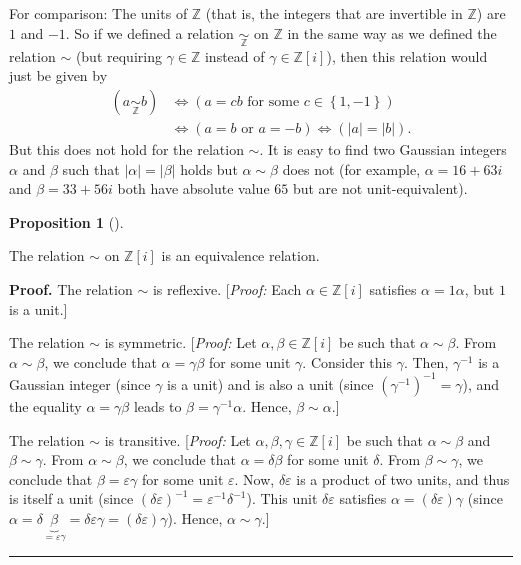 \documentclass[numbers=enddot,12pt,final,onecolumn,notitlepage]{scrartcl}%
\numberwithin{exer}{subsection}
\theoremstyle{definition}
\newtheorem{prop}[theo]{Proposition}
\newenvironment{proposition}[1][]
{\begin{prop}[#1]\begin{leftbar}}
{\end{leftbar}\end{prop}}
\newenvironment{proof}[1][Proof]{\noindent\textbf{#1.} }{\ \rule{0.5em}{0.5em}}
\begin{document}
For comparison: The units of $\mathbb{Z}$ (that is, the integers that are
invertible in $\mathbb{Z}$) are $1$ and $-1$. So if we defined a relation
$\underset{\mathbb{Z}}{\sim}$ on $\mathbb{Z}$ in the same way as we defined
the relation $\sim$ (but requiring $\gamma\in\mathbb{Z}$ instead of $\gamma
\in\mathbb{Z}\left[  i\right]  $), then this relation would just be given by%
\begin{align}
\left(  a\underset{\mathbb{Z}}{\sim}b\right)   &  \Longleftrightarrow\left(
a=cb\text{ for some }c\in\left\{  1,-1\right\}  \right) \nonumber\\
&  \Longleftrightarrow\left(  a=b\text{ or }a=-b\right)  \Longleftrightarrow
\left(  \left\vert a\right\vert =\left\vert b\right\vert \right)  .
\label{eq.Z[i].gauss.unit-Z}%
\end{align}
But this does not hold for the relation $\sim$. It is easy to find two
Gaussian integers $\alpha$ and $\beta$ such that $\left\vert \alpha\right\vert
=\left\vert \beta\right\vert $ holds but $\alpha\sim\beta$ does not (for
example, $\alpha=16+63i$ and $\beta=33+56i$ both have absolute value $65$ but
are not unit-equivalent).

\begin{proposition}
\label{prop.Z[i].gauss.uniteq.eqrel}The relation $\sim$ on $\mathbb{Z}\left[
i\right]  $ is an equivalence relation.
\end{proposition}

\begin{proof}
The relation $\sim$ is reflexive. [\textit{Proof:} Each $\alpha\in
\mathbb{Z}\left[  i\right]  $ satisfies $\alpha=1\alpha$, but $1$ is a unit.]

The relation $\sim$ is symmetric. [\textit{Proof:} Let $\alpha,\beta
\in\mathbb{Z}\left[  i\right]  $ be such that $\alpha\sim\beta$. From
$\alpha\sim\beta$, we conclude that $\alpha=\gamma\beta$ for some unit
$\gamma$. Consider this $\gamma$. Then, $\gamma^{-1}$ is a Gaussian integer
(since $\gamma$ is a unit) and is also a unit (since $\left(  \gamma
^{-1}\right)  ^{-1}=\gamma$), and the equality $\alpha=\gamma\beta$ leads to
$\beta=\gamma^{-1}\alpha$. Hence, $\beta\sim\alpha$.]

The relation $\sim$ is transitive. [\textit{Proof:} Let $\alpha,\beta
,\gamma\in\mathbb{Z}\left[  i\right]  $ be such that $\alpha\sim\beta$ and
$\beta\sim\gamma$. From $\alpha\sim\beta$, we conclude that $\alpha
=\delta\beta$ for some unit $\delta$. From $\beta\sim\gamma$, we conclude that
$\beta=\varepsilon\gamma$ for some unit $\varepsilon$. Now, $\delta
\varepsilon$ is a product of two units, and thus is itself a unit (since
$\left(  \delta\varepsilon\right)  ^{-1}=\varepsilon^{-1}\delta^{-1}$). This
unit $\delta\varepsilon$ satisfies $\alpha=\left(  \delta\varepsilon\right)
\gamma$ (since $\alpha=\delta\underbrace{\beta}_{=\varepsilon\gamma}%
=\delta\varepsilon\gamma=\left(  \delta\varepsilon\right)  \gamma$). Hence,
$\alpha\sim\gamma$.]
\end{proof}
\end{document}
